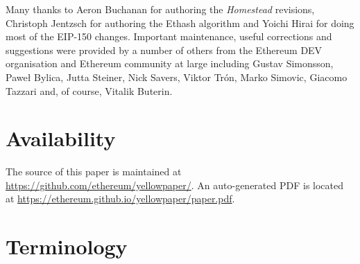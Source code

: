 \documentclass[9pt,oneside]{amsart}
\begin{document}
\begin{multicols}{2}
Many thanks to Aeron Buchanan for authoring the \textit{Homestead} revisions, Christoph Jentzsch for authoring the Ethash algorithm and Yoichi Hirai for doing most of the EIP-150 changes. Important maintenance, useful corrections and suggestions were provided by a number of others from the Ethereum DEV organisation and Ethereum community at large including Gustav Simonsson, Pawe\l{} Bylica, Jutta Steiner, Nick Savers, Viktor Tr\'{o}n, Marko Simovic, Giacomo Tazzari and, of course, Vitalik Buterin.

\section{Availability}

The source of this paper is maintained at \url{https://github.com/ethereum/yellowpaper/}. An auto-generated PDF is located at \url{https://ethereum.github.io/yellowpaper/paper.pdf}.




\end{multicols}

\appendix

\section{Terminology} \label{ch:Terminology}
\end{document}
